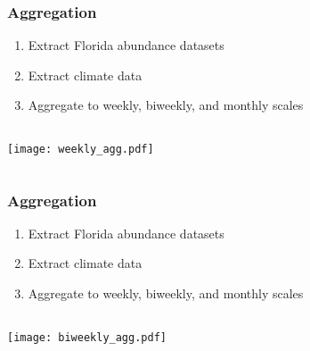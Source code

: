 \documentclass{beamer}
\begin{document}
\begin{frame}
\frametitle{Aggregation}

\begin{enumerate}
	\item Extract Florida abundance datasets 
	
	\item Extract climate data 
	
	\item Aggregate to weekly, biweekly, and monthly scales	
\end{enumerate}


\vspace{0.7cm}
\begin{columns}
	\begin{column}{0.7\textwidth}
		\texttt{[image: weekly\_agg.pdf]}
	\end{column}
	\begin{column}{0.3\textwidth}
		
	\end{column}
\end{columns}

\end{frame}

\begin{frame}
\frametitle{Aggregation}

\begin{enumerate}
	\item Extract Florida abundance datasets 
	
	\item Extract climate data 
	
	\item Aggregate to weekly, biweekly, and monthly scales	
\end{enumerate}


\vspace{0.7cm}
\begin{columns}
	\begin{column}{0.7\textwidth}
		\texttt{[image: biweekly\_agg.pdf]}
	\end{column}
	\begin{column}{0.3\textwidth}
		
	\end{column}
\end{columns}

\end{frame}
\end{document}
